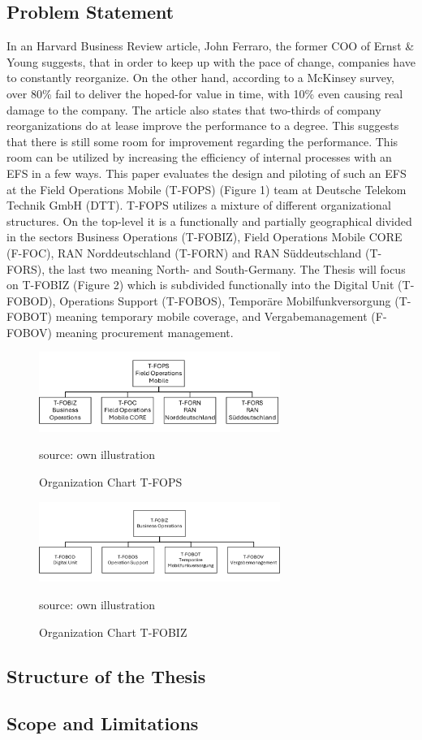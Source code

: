 \subsection{Problem Statement}
In an Harvard Business Review article, John Ferraro, the former COO of Ernst \& Young suggests, that in order to keep up with the pace of change, companies have to constantly reorganize.  On the other hand, according to a McKinsey survey, over 80\% fail to deliver the hoped-for value in time, with 10\% even causing real damage to the company.  The article also states that two-thirds of company reorganizations do at lease improve the performance to a degree.  This suggests that there is still some room for improvement regarding the performance. 
This room can be utilized by increasing the efficiency of internal processes with an EFS in a few ways. 
This paper evaluates the design and piloting of such an EFS at the Field Operations Mobile (T-FOPS) (Figure 1) team at Deutsche Telekom Technik GmbH (DTT). T-FOPS utilizes a mixture of different organizational structures. On the top-level it is a functionally and partially geographical divided in the sectors Business Operations (T-FOBIZ), Field Operations Mobile CORE (F-FOC), RAN Norddeutschland (T-FORN) and RAN Süddeutschland (T-FORS), the last two meaning North- and South-Germany. The Thesis will focus on T-FOBIZ (Figure 2) which is subdivided functionally into the Digital Unit (T-FOBOD), Operations Support (T-FOBOS), Temporäre Mobilfunkversorgung (T-FOBOT) meaning temporary mobile coverage, and Vergabemanagement (F-FOBOV) meaning procurement management. 

\begin{figure}[H]
    \centering
    \includegraphics[width=0.7\textwidth]{abbildungen/FopsOrga}
    \caption{Organization Chart T-FOPS}
    \label{fig:FopsOrga}
    source: own illustration
\end{figure}
\begin{figure}[H]
    \centering
    \includegraphics[width=0.7\textwidth]{abbildungen/FobizOrga}
    \caption{Organization Chart T-FOBIZ}
    \label{fig:FobizOrga}
    source: own illustration
\end{figure}

\subsection{Structure of the Thesis}

\subsection{Scope and Limitations}

